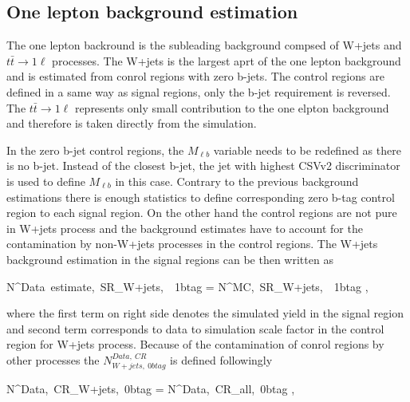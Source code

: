 
\subsection{One lepton background estimation}


The  one lepton backround is the subleading background compsed of W+jets and $t\bar{t} \to 1\ell$ processes. The W+jets is the largest aprt of the one lepton background and is estimated from conrol regions with zero b-jets. The control regions are defined in a same way as signal regions, only the b-jet requirement is reversed. The   $t\bar{t} \to 1\ell$ represents only small contribution to the one elpton background and therefore is taken directly from the simulation.

In the zero b-jet control regions, the $M_{\ell b}$ variable needs to be redefined as there is no b-jet. Instead of the closest b-jet, the jet with highest CSVv2 discriminator is used to define $M_{\ell b}$ in this case. Contrary to the previous background estimations there is enough statistics to define corresponding zero b-tag control region to each signal region. On the other hand the control regions are not pure in W+jets process and the background estimates have to account for the contamination by non-W+jets processes in the control regions. The W+jets background estimation in the signal regions can be then written as

{
N^{Data~estimate,~SR}_{W+jets,~\geq~1btag}  = N^{MC,~SR}_{W+jets,~\geq~1btag} \times  {},
}

where the first term on right side denotes the simulated yield in the signal region and second term corresponds to data to simulation scale factor in the control region for W+jets process. Because of the contamination of conrol regions by other processes the $N^{Data,~CR}_{W+jets,~0btag}$ is defined followingly


{
N^{Data,~CR}_{W+jets,~0btag} = N^{Data,~CR}_{all,~0btag} \times {} ,
}

